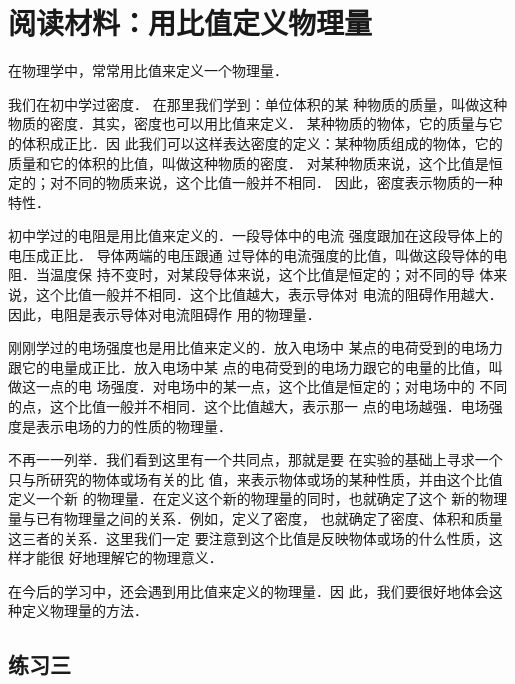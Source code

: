 \section*{阅读材料：用比值定义物理量}
在物理学中，常常用比值来定义一个物理量．

我们在初中学过密度．
在那里我们学到：单位体积的某
种物质的质量，叫做这种物质的密度．其实，密度也可以用比值来定义．
某种物质的物体，它的质量与它的体积成正比．因
此我们可以这样表达密度的定义：某种物质组成的物体，它的
质量和它的体积的比值，叫做这种物质的密度．
对某种物质来说，这个比值是恒定的；对不同的物质来说，这个比值一般并不相同．
因此，密度表示物质的一种特性．

初中学过的电阻是用比值来定义的．一段导体中的电流
强度跟加在这段导体上的电压成正比．
导体两端的电压跟通
过导体的电流强度的比值，叫做这段导体的电阻．当温度保
持不变时，对某段导体来说，这个比值是恒定的；对不同的导
体来说，这个比值一般并不相同．这个比值越大，表示导体对
电流的阻碍作用越大．因此，电阻是表示导体对电流阻碍作
用的物理量．

刚刚学过的电场强度也是用比值来定义的．放入电场中
某点的电荷受到的电场力跟它的电量成正比．放入电场中某
点的电荷受到的电场力跟它的电量的比值，叫做这一点的电
场强度．对电场中的某一点，这个比值是恒定的；对电场中的
不同的点，这个比值一般并不相同．这个比值越大，表示那一
点的电场越强．电场强度是表示电场的力的性质的物理量．

不再一一列举．我们看到这里有一个共同点，那就是要
在实验的基础上寻求一个只与所研究的物体或场有关的比
值，来表示物体或场的某种性质，并由这个比值定义一个新
的物理量．在定义这个新的物理量的同时，也就确定了这个
新的物理量与已有物理量之间的关系．例如，定义了密度，
也就确定了密度、体积和质量这三者的关系．这里我们一定
要注意到这个比值是反映物体或场的什么性质，这样才能很
好地理解它的物理意义．

在今后的学习中，还会遇到用比值来定义的物理量．因
此，我们要很好地体会这种定义物理量的方法．

\subsection*{练习三}

